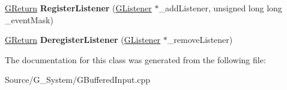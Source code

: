 \begin{DoxyCompactItemize}
\item 
\hyperlink{namespaceGW_a67a839e3df7ea8a5c5686613a7a3de21}{G\+Return} {\bfseries Register\+Listener} (\hyperlink{classGW_1_1CORE_1_1GListener}{G\+Listener} $\ast$\+\_\+add\+Listener, unsigned long long \+\_\+event\+Mask)\hypertarget{classBufferedInput_a210c1c6357ea98ed6cb443fc9e834dca}{}\label{classBufferedInput_a210c1c6357ea98ed6cb443fc9e834dca}

\item 
\hyperlink{namespaceGW_a67a839e3df7ea8a5c5686613a7a3de21}{G\+Return} {\bfseries Deregister\+Listener} (\hyperlink{classGW_1_1CORE_1_1GListener}{G\+Listener} $\ast$\+\_\+remove\+Listener)\hypertarget{classBufferedInput_ac3b002049f7542f8d6e2d87e29113f8c}{}\label{classBufferedInput_ac3b002049f7542f8d6e2d87e29113f8c}

\end{DoxyCompactItemize}


The documentation for this class was generated from the following file\+:\begin{DoxyCompactItemize}
\item 
Source/\+G\+\_\+\+System/G\+Buffered\+Input.\+cpp\end{DoxyCompactItemize}
